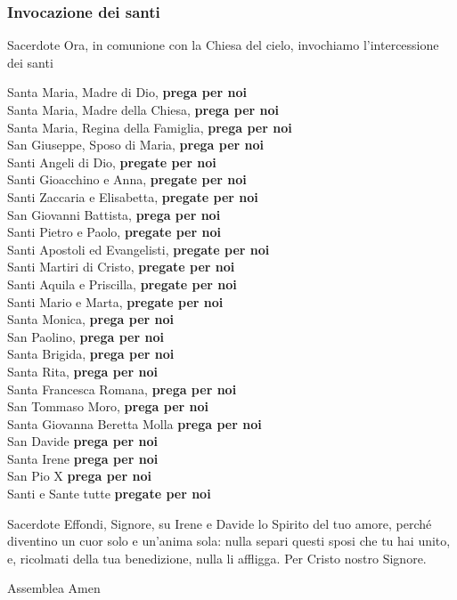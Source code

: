 \newpage

\subsubsection*{Invocazione dei santi}

	\begin{dialoghi}
	\item[Sacerdote] Ora, in comunione con la Chiesa del cielo, invochiamo l'intercessione dei santi

	Santa Maria, Madre di Dio, \textbf{prega per noi}\\
	Santa Maria, Madre della Chiesa, \textbf{prega per noi}\\
	Santa Maria, Regina della Famiglia, \textbf{prega per noi}\\
	San Giuseppe, Sposo di Maria, \textbf{prega per noi}\\
	Santi Angeli di Dio, \textbf{pregate per noi}\\
	Santi Gioacchino e Anna, \textbf{pregate per noi}\\
	Santi Zaccaria e Elisabetta, \textbf{pregate per noi}\\
	San Giovanni Battista, \textbf{prega per noi}\\
	Santi Pietro e Paolo, \textbf{pregate per noi}\\
	Santi Apostoli ed Evangelisti, \textbf{pregate per noi}\\
	Santi Martiri di Cristo, \textbf{pregate per noi}\\
	Santi Aquila e Priscilla, \textbf{pregate per noi}\\
	Santi Mario e Marta, \textbf{pregate per noi}\\
	Santa Monica, \textbf{prega per noi}\\
	San Paolino, \textbf{prega per noi}\\
	Santa Brigida, \textbf{prega per noi}\\
	Santa Rita, \textbf{prega per noi}\\
	Santa Francesca Romana, \textbf{prega per noi}\\
	San Tommaso Moro, \textbf{prega per noi}\\
	Santa Giovanna Beretta Molla \textbf{prega per noi}\\
	San Davide \textbf{prega per noi}\\
	Santa Irene \textbf{prega per noi}\\
	San Pio X \textbf{prega per noi}\\
	Santi e Sante tutte \textbf{pregate per noi}
	\item[Sacerdote] Effondi, Signore, su Irene e Davide lo Spirito del tuo amore, perché diventino un cuor solo e un'anima sola: nulla separi questi sposi che tu hai unito, e, ricolmati della tua benedizione, nulla li affligga. Per Cristo nostro Signore.
	\item[Assemblea] Amen
	\end{dialoghi}

\newpage